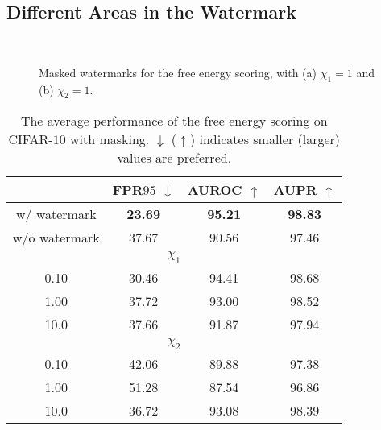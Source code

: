 \documentclass{article}
\begin{document}
\subsection{Different Areas in the Watermark} 

\begin{figure}[t]
    \centering
    ~~~~~~~~~~~~~~~~~~~~~~~~~~~~~~~~~~~~

    \caption{{Masked watermarks for the free energy scoring, with (a) $\chi_1=1$ and (b) $\chi_2=1$.}}
    \label{fig:masked}

\end{figure}

\begin{table}\centering
\caption{{The average performance of the free energy scoring on CIFAR-$10$ with masking. $\downarrow$ ($\uparrow$) indicates smaller (larger) values are preferred.}} \label{tab: masked}
\vspace{5pt}
\scriptsize
{
\begin{tabular}{c|ccc}
\toprule[1.5pt]
& FPR$95$ $\downarrow$     & AUROC $\uparrow$       & AUPR $\uparrow$      \\
\midrule[0.6pt]
w/ watermark & \textbf{23.69} & \textbf{95.21} & \textbf{98.83} \\
w/o watermark & 37.67 & 90.56 & 97.46 \\
\midrule[0.6pt]
\multicolumn{4}{c}{\cellcolor{greyL}$\chi_1$} \\
\midrule[0.6pt]
0.10 & 30.46 & 94.41 & 98.68 \\
1.00 & 37.72 & 93.00 & 98.52 \\
10.0 & 37.66 & 91.87 & 97.94 \\
\midrule[0.6pt]
\multicolumn{4}{c}{\cellcolor{greyL}$\chi_2$} \\
\midrule[0.6pt]
0.10 & 42.06 & 89.88 & 97.38 \\
1.00 & 51.28 & 87.54 & 96.86 \\
10.0 & 36.72 & 93.08 & 98.39 \\
\bottomrule[1.5pt]
\end{tabular}
}
\end{table}
\end{document}
